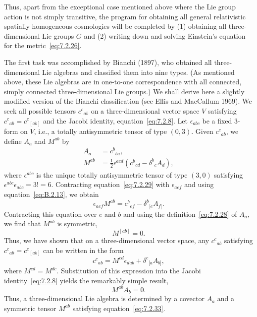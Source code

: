 Thus, apart from the exceptional case mentioned above where the Lie group action
is not simply transitive, the program for obtaining all general relativistic spatially
homogeneous cosmologies will be completed by (1) obtaining all three-dimensional
Lie groups \(G\) and (2) writing down and solving Einstein's equation for the
metric~\eqref{eq:7.2.26}.

The first task was accomplished by Bianchi (1897), who obtained all
three-dimensional Lie algebras and classified them into nine types. (As mentioned
above, these Lie algebras are in one-to-one correspondence with all connected,
simply connected three-dimensional Lie groups.) We shall derive here a slightly
modified version of the Bianchi classification (see Ellis and MacCallum 1969). We
seek all possible tensors \(c^c{}_{ab}\) on a three-dimensional vector space \(V\)
satisfying \(c^c{}_{ab}=c^c{}_{[ab]}\) and the Jacobi identity,
equation~\eqref{eq:7.2.8}. Let \(\epsilon_{abc}\) be a fixed 3-form on \(V\),
i.e., a totally antisymmetric tensor of type \((0,3)\). Given \(c^c{}_{ab}\), we
define \(A_a\) and \(M^{ab}\) by
\begin{align}
  A_a&=c^b{}_{ba} ,
  \tag{7.2.28}\label{eq:7.2.28}\\
  M^{ab}&=\frac12\epsilon^{acd}
    \left(c^b{}_{cd}-\delta^b{}_cA_d\right) ,
  \tag{7.2.29}\label{eq:7.2.29}
\end{align}
where \(\epsilon^{abc}\) is the unique totally antisymmetric tensor of type
\((3,0)\) satisfying \(\epsilon^{abc}\epsilon_{abc}=3!=6\). Contracting
equation~\eqref{eq:7.2.29} with \(\epsilon_{aef}\) and using
equation~\eqref{eq:B.2.13}, we obtain
\begin{equation}
  \epsilon_{aef}M^{ab}
    =c^b{}_{ef}-\delta^b{}_{[e}A_{f]} .
  \tag{7.2.30}\label{eq:7.2.30}
\end{equation}
Contracting this equation over \(e\) and \(b\) and using the
definition~\eqref{eq:7.2.28} of \(A_a\), we find that \(M^{ab}\) is symmetric,
\begin{equation}
  M^{[ab]}=0 .
  \tag{7.2.31}\label{eq:7.2.31}
\end{equation}
Thus, we have shown that on a three-dimensional vector space, any \(c^c{}_{ab}\)
satisfying \(c^c{}_{ab}=c^c{}_{[ab]}\) can be written in the form
\begin{equation}
  c^c{}_{ab}
    =M^{cd}\epsilon_{dab}+\delta^c{}_{[a}A_{b]} ,
  \tag{7.2.32}\label{eq:7.2.32}
\end{equation}
where \(M^{cd}=M^{dc}\). Substitution of this expression into the Jacobi
identity~\eqref{eq:7.2.8} yields the remarkably simple result,
\begin{equation}
  M^{ab}A_b=0 .
  \tag{7.2.33}\label{eq:7.2.33}
\end{equation}
Thus, a three-dimensional Lie algebra is determined by a covector \(A_a\) and a
symmetric tensor \(M^{ab}\) satisfying equation~\eqref{eq:7.2.33}.

